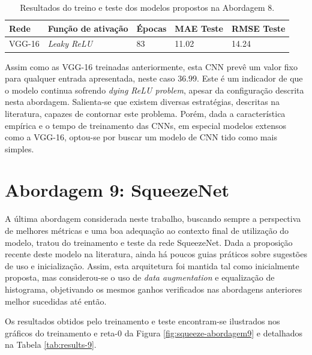\begin{table}[!ht]
\centering
\caption{Resultados do treino e teste dos modelos propostos na Abordagem 8.}
\label{tab:results-8}
 \begin{tabular}{l l l l l }
	 \toprule
	 Rede & Função de ativação & Épocas & MAE Teste & RMSE Teste \\
	 \midrule
	 VGG-16 & \emph{Leaky ReLU} & 83 & 11.02 & 14.24 \\
	 \bottomrule
 \end{tabular}
\end{table}

Assim como as VGG-16 treinadas anteriormente, esta CNN prevê um valor fixo para qualquer entrada apresentada, neste caso $36.99$. Este é um indicador de que o modelo continua sofrendo \emph{dying ReLU problem}, apesar da configuração descrita nesta abordagem. Salienta-se que existem diversas estratégias, descritas na literatura, capazes de contornar este problema. Porém, dada a característica empírica e o tempo de treinamento das CNNs, em especial modelos extensos como a VGG-16, optou-se por buscar um modelo de CNN tido como mais simples.

\section{Abordagem 9: SqueezeNet}

	A última abordagem considerada neste trabalho, buscando sempre a perspectiva de melhores métricas e uma boa adequação ao contexto final de utilização do modelo, tratou do treinamento e teste da rede SqueezeNet. Dada a proposição recente deste modelo na literatura, ainda há poucos guias práticos sobre sugestões de uso e inicialização. Assim, esta arquitetura foi mantida tal como inicialmente proposta, mas considerou-se o uso de \emph{data augmentation} e equalização de histograma, objetivando os mesmos ganhos verificados nas abordagens anteriores melhor sucedidas até então.

	Os resultados obtidos pelo treinamento e teste encontram-se ilustrados nos gráficos do treinamento e reta-0 da Figura \ref{fig:squeeze-abordagem9} e detalhados na Tabela \ref{tab:results-9}.

